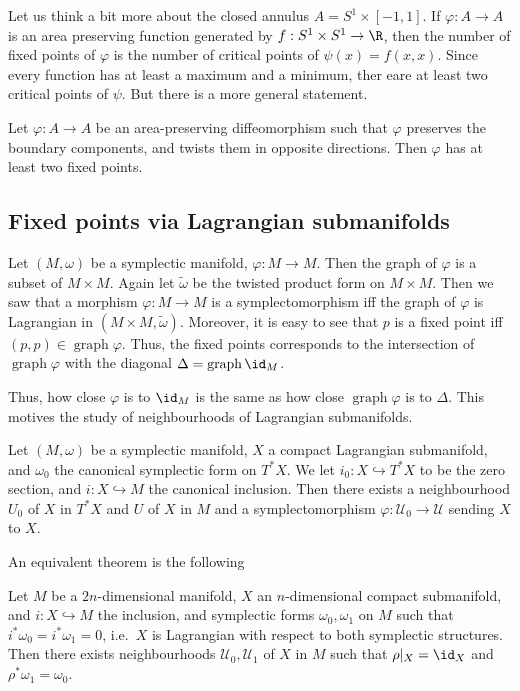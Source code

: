 \documentclass[a4paper]{article}
\DeclareMathOperator{\grph}{graph}
\begin{document}
Let us think a bit more about the closed annulus $A = S^1 \times [-1, 1]$. If $\varphi: A \to A$ is an area preserving function generated by $f: S^1 \times S^1 \to \R$, then the number of fixed points of $\varphi$ is the number of critical points of $\psi(x) = f(x, x)$. Since every function has at least a maximum and a minimum, ther eare at least two critical points of $\psi$. But there is a more general statement.
\begin{thm}
  Let $\varphi: A \to A$ be an area-preserving diffeomorphism such that $\varphi$ preserves the boundary components, and twists them in opposite directions. Then $\varphi$ has at least two fixed points.
\end{thm}

\subsection{Fixed points via Lagrangian submanifolds}
Let $(M, \omega)$ be a symplectic manifold, $\varphi: M \to M$. Then the graph of $\varphi$ is a subset of $M \times M$. Again let $\tilde{\omega}$ be the twisted product form on $M \times M$. Then we saw that a morphism $\varphi: M \to M$ is a symplectomorphism iff the graph of $\varphi$ is Lagrangian in $(M \times M, \tilde{\omega})$. Moreover, it is easy to see that $p$ is a fixed point iff $(p, p) \in \grph \varphi$. Thus, the fixed points corresponds to the intersection of $\grph \varphi$ with the diagonal $\Delta = \grph \id_M$.

Thus, how close $\varphi$ is to $\id_M$ is the same as how close $\grph \varphi$ is to $\Delta$. This motives the study of neighbourhoods of Lagrangian submanifolds.

\begin{thm}
  Let $(M, \omega)$ be a symplectic manifold, $X$ a compact Lagrangian submanifold, and $\omega_0$ the canonical symplectic form on $T^* X$. We let $i_0: X \hookrightarrow T^* X$ to be the zero section, and $i: X \hookrightarrow M$ the canonical inclusion. Then there exists a neighbourhood $U_0$ of $X$ in $T^* X$ and $U$ of $X$ in $M$ and a symplectomorphism $\varphi: \mathcal{U}_0 \to \mathcal{U}$ sending $X$ to $X$.
\end{thm}

An equivalent theorem is the following
\begin{thm}[Weinstein]
  Let $M$ be a $2n$-dimensional manifold, $X$ an $n$-dimensional compact submanifold, and $i: X \hookrightarrow M$ the inclusion, and symplectic forms $\omega_0, \omega_1$ on $M$ such that $i^* \omega_0 = i^* \omega_1 = 0$, i.e.\ $X$ is Lagrangian with respect to both symplectic structures. Then there exists neighbourhoods $\mathcal{U}_0, \mathcal{U}_1$ of $X$ in $M$ such that $\rho|_X = \id_X $ and $\rho^* \omega_1 = \omega_0$.
\end{thm}
\end{document}
